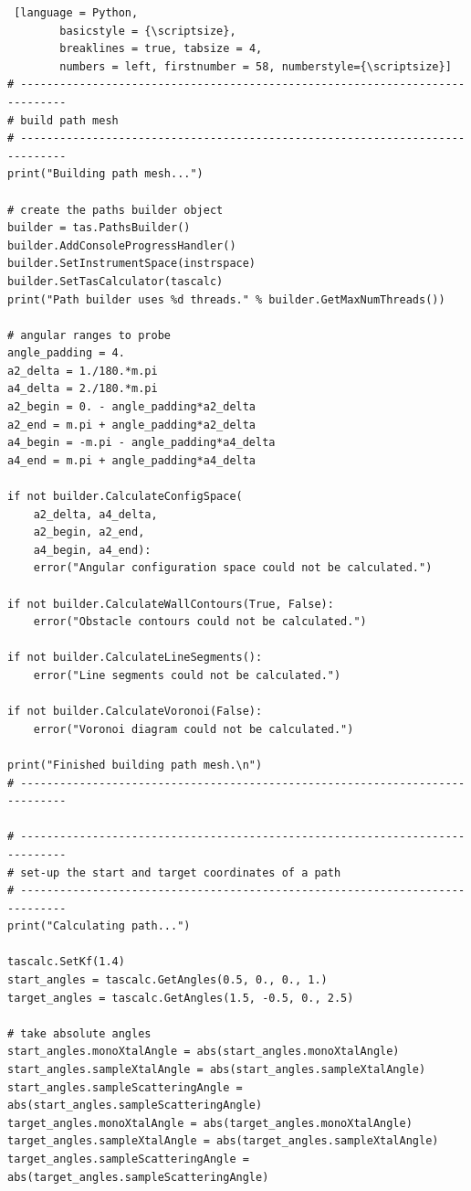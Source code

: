 \begin{listing}[htb]
	\begin{lstlisting} [language = Python, 
		basicstyle = {\scriptsize},
		breaklines = true, tabsize = 4,
		numbers = left, firstnumber = 58, numberstyle={\scriptsize}]
# -----------------------------------------------------------------------------
# build path mesh
# -----------------------------------------------------------------------------
print("Building path mesh...")

# create the paths builder object
builder = tas.PathsBuilder()
builder.AddConsoleProgressHandler()
builder.SetInstrumentSpace(instrspace)
builder.SetTasCalculator(tascalc)
print("Path builder uses %d threads." % builder.GetMaxNumThreads())

# angular ranges to probe
angle_padding = 4.
a2_delta = 1./180.*m.pi
a4_delta = 2./180.*m.pi
a2_begin = 0. - angle_padding*a2_delta
a2_end = m.pi + angle_padding*a2_delta
a4_begin = -m.pi - angle_padding*a4_delta
a4_end = m.pi + angle_padding*a4_delta

if not builder.CalculateConfigSpace(
	a2_delta, a4_delta,
	a2_begin, a2_end,
	a4_begin, a4_end):
	error("Angular configuration space could not be calculated.")

if not builder.CalculateWallContours(True, False):
	error("Obstacle contours could not be calculated.")

if not builder.CalculateLineSegments():
	error("Line segments could not be calculated.")

if not builder.CalculateVoronoi(False):
	error("Voronoi diagram could not be calculated.")

print("Finished building path mesh.\n")
# -----------------------------------------------------------------------------

# -----------------------------------------------------------------------------
# set-up the start and target coordinates of a path
# -----------------------------------------------------------------------------
print("Calculating path...")

tascalc.SetKf(1.4)
start_angles = tascalc.GetAngles(0.5, 0., 0., 1.)
target_angles = tascalc.GetAngles(1.5, -0.5, 0., 2.5)

# take absolute angles
start_angles.monoXtalAngle = abs(start_angles.monoXtalAngle)
start_angles.sampleXtalAngle = abs(start_angles.sampleXtalAngle)
start_angles.sampleScatteringAngle = abs(start_angles.sampleScatteringAngle)
target_angles.monoXtalAngle = abs(target_angles.monoXtalAngle)
target_angles.sampleXtalAngle = abs(target_angles.sampleXtalAngle)
target_angles.sampleScatteringAngle = abs(target_angles.sampleScatteringAngle)


\end{lstlisting}
\end{listing}
